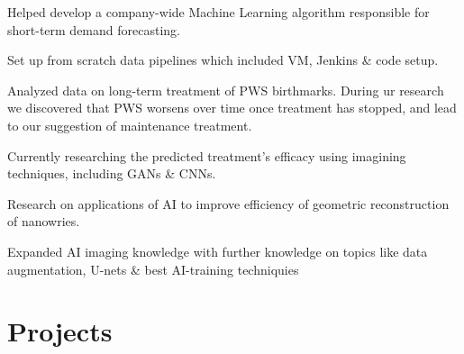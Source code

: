 \documentclass[]{CV}
\begin{document}
\begin{minipage}[t]{0.705\textwidth}
\vspace{\topsep} %
\begin{tightemize}

\item Helped develop a company-wide Machine Learning algorithm responsible for short-term demand forecasting.

\item Set up from scratch data pipelines which included VM, Jenkins \& code setup.

\end{tightemize}


\vspace{\topsep}
\begin{tightemize}

\item Analyzed data on long-term treatment of PWS birthmarks. During ur research we discovered that PWS worsens over time once treatment has stopped, and lead to our suggestion of maintenance treatment.

\item Currently researching the predicted treatment's efficacy using imagining techniques, including GANs \& CNNs. 


\end{tightemize}
\sectionsep

\vspace{\topsep} %
\begin{tightemize}
\item Research on applications of AI to improve efficiency of geometric reconstruction of nanowries.

\item Expanded AI imaging knowledge with further knowledge on topics like data augmentation, U-nets \& best AI-training techniquies

\end{tightemize}



\section{Projects}
\begin{tightemize}


\end{tightemize}
\end{minipage}
\end{document}
